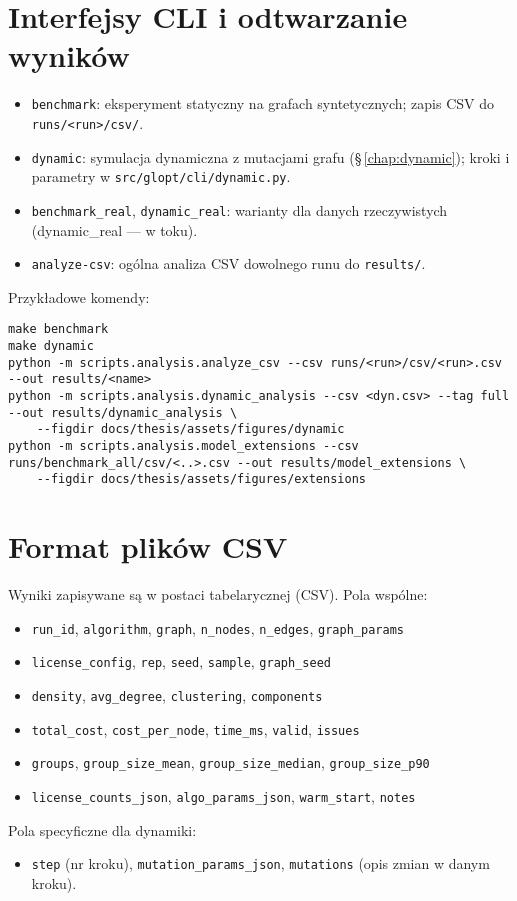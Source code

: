 \section{Interfejsy CLI i odtwarzanie wyników}
\begin{itemize}
  \item \texttt{benchmark}: eksperyment statyczny na grafach syntetycznych; zapis CSV do \texttt{runs/<run>/csv/}.
  \item \texttt{dynamic}: symulacja dynamiczna z mutacjami grafu (\S\,\ref{chap:dynamic}); kroki i parametry w \texttt{src/glopt/cli/dynamic.py}.
  \item \texttt{benchmark\_real}, \texttt{dynamic\_real}: warianty dla danych rzeczywistych (dynamic\_real — w toku).
  \item \texttt{analyze-csv}: ogólna analiza CSV dowolnego runu do \texttt{results/}.
\end{itemize}
Przykładowe komendy:
\begin{verbatim}
make benchmark
make dynamic
python -m scripts.analysis.analyze_csv --csv runs/<run>/csv/<run>.csv --out results/<name>
python -m scripts.analysis.dynamic_analysis --csv <dyn.csv> --tag full --out results/dynamic_analysis \
    --figdir docs/thesis/assets/figures/dynamic
python -m scripts.analysis.model_extensions --csv runs/benchmark_all/csv/<..>.csv --out results/model_extensions \
    --figdir docs/thesis/assets/figures/extensions
\end{verbatim}

\section{Format plików CSV}
Wyniki zapisywane są w postaci tabelarycznej (CSV). Pola wspólne:
\begin{itemize}
  \item \texttt{run\_id}, \texttt{algorithm}, \texttt{graph}, \texttt{n\_nodes}, \texttt{n\_edges}, \texttt{graph\_params}
  \item \texttt{license\_config}, \texttt{rep}, \texttt{seed}, \texttt{sample}, \texttt{graph\_seed}
  \item \texttt{density}, \texttt{avg\_degree}, \texttt{clustering}, \texttt{components}
  \item \texttt{total\_cost}, \texttt{cost\_per\_node}, \texttt{time\_ms}, \texttt{valid}, \texttt{issues}
  \item \texttt{groups}, \texttt{group\_size\_mean}, \texttt{group\_size\_median}, \texttt{group\_size\_p90}
  \item \texttt{license\_counts\_json}, \texttt{algo\_params\_json}, \texttt{warm\_start}, \texttt{notes}
\end{itemize}
Pola specyficzne dla dynamiki:
\begin{itemize}
  \item \texttt{step} (nr kroku), \texttt{mutation\_params\_json}, \texttt{mutations} (opis zmian w danym kroku).
\end{itemize}

